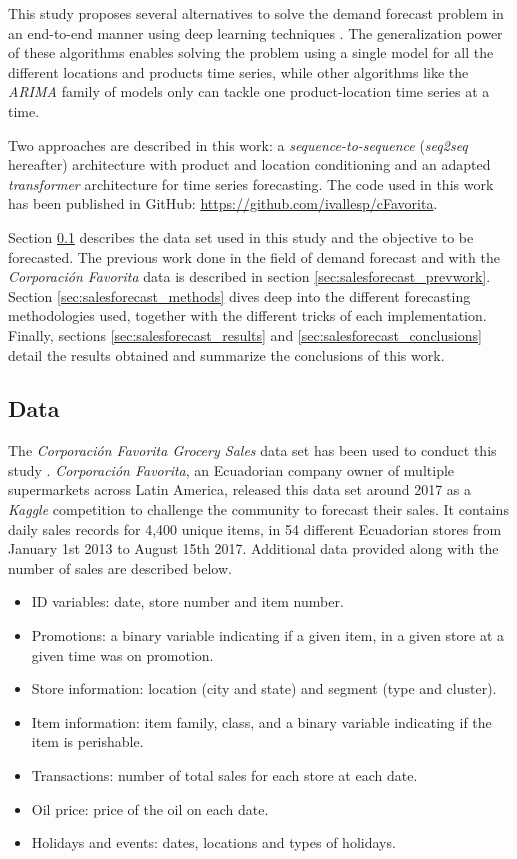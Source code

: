 This study proposes several alternatives to solve the demand forecast problem in an end-to-end manner using deep learning techniques \autocite{Goodfellow2016}. The generalization power of these algorithms enables solving the problem using a single model for all the different locations and products time series, while other algorithms like the \textit{ARIMA} family of models \autocite{Hyndman2018} only can tackle one product-location time series at a time.

Two approaches are described in this work: a \textit{sequence-to-sequence} (\textit{seq2seq} hereafter) architecture with product and location conditioning and an adapted \textit{transformer} architecture for time series forecasting. The code used in this work has been published in GitHub: \url{https://github.com/ivallesp/cFavorita}.

Section \ref{sec:salesforecast_data} describes the data set used in this study and the objective to be forecasted. The previous work done in the field of demand forecast and with the \textit{Corporación Favorita} data is described in section \ref{sec:salesforecast_prevwork}. Section \ref{sec:salesforecast_methods} dives deep into the different forecasting methodologies used, together with the different tricks of each implementation.
Finally, sections \ref{sec:salesforecast_results} and \ref{sec:salesforecast_conclusions} detail the results obtained and summarize the conclusions of this work.


\subsection{Data} \label{sec:salesforecast_data}
The \textit{Corporación Favorita Grocery Sales} data set  has been used to conduct this study \autocite{corporacionfavoritadataset2018}. \textit{Corporación Favorita}, an Ecuadorian company owner of multiple supermarkets across Latin America, released this data set around 2017 as a \textit{Kaggle} competition to challenge the community to forecast their sales. It contains daily sales records for 4,400 unique items, in 54 different Ecuadorian stores from January 1st 2013 to August 15th 2017. Additional data provided along with the number of sales are described below.

\begin{itemize}
	\item ID variables: date, store number and item number.
	\item Promotions: a binary variable indicating if a given item, in a given store at a given time was on promotion.
	\item Store information: location (city and state) and segment (type and cluster).
	\item Item information: item family, class, and a binary variable indicating if the item is perishable.
	\item Transactions: number of total sales for each store at each date.
	\item Oil price: price of the oil on each date.
	\item Holidays and events: dates, locations and types of holidays.
\end{itemize}

